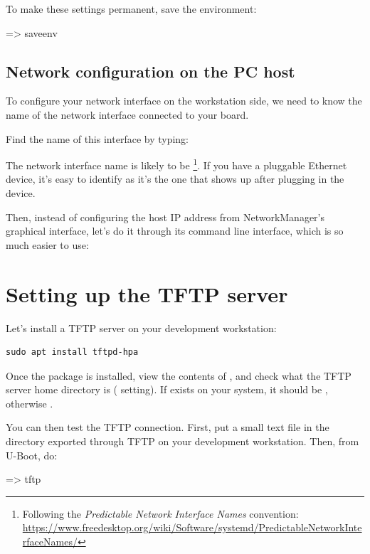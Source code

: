 To make these settings permanent, save the environment:

\begin{ubootinput}
=> saveenv
\end{ubootinput}

\subsection{Network configuration on the PC host}

To configure your network interface on the workstation side, we need
to know the name of the network interface connected to your board.

Find the name of this interface by typing:

The network interface name is likely to be
\footnote{Following the {\em Predictable Network Interface
Names} convention:
\url{https://www.freedesktop.org/wiki/Software/systemd/PredictableNetworkInterfaceNames/}}.
If you have a pluggable Ethernet device, it's easy to identify as it's
the one that shows up after plugging in the device.

Then, instead of configuring the host IP address from NetworkManager's
graphical interface, let's do it through its command line interface,
which is so much easier to use:


\section{Setting up the TFTP server}

Let's install a TFTP server on your development workstation:

\begin{verbatim}
sudo apt install tftpd-hpa
\end{verbatim}

Once the package is installed, view the contents of
, and check what the TFTP server home directory is
( setting). If  exists on your system,
it should be , otherwise .

You can then test the TFTP connection. First, put a small text file in
the directory exported through TFTP on your development
workstation. Then, from U-Boot, do:

\begin{ubootinput}
=> tftp %
\end{ubootinput}

